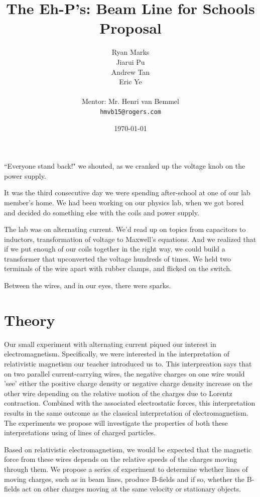 \documentclass[12pt,letterpaper]{article}
\begin{document}
\title{The Eh-P's: Beam Line for Schools Proposal}
\author{
Ryan Marks\\
Jiarui Pu \\ 
Andrew Tan\\
Eric Ye\\
\\
Mentor: Mr. Henri van Bemmel\\
\normalsize{\texttt{hmvb15@rogers.com}}
}

\date{\today}
\maketitle

``Everyone stand back!" we shouted, as we cranked up the voltage knob on the power supply.

It was the third consecutive day we were spending after-school at one of our lab member’s home. We had been working on our physics lab, when we got bored and decided do something else with the coils and power supply.

The lab was on alternating current. We’d read up on topics from capacitors to inductors, transformation of voltage to Maxwell's equations.
And we realized that if we put enough of our coils together in the right way, we could build a transformer that upconverted the voltage hundreds of times. We held two terminals of the wire apart with rubber clamps, and flicked on the switch.

Between the wires, and in our eyes, there were sparks.
\section{Theory}
Our small experiment with alternating current piqued our interest in electromagnetism. Specifically, we were interested in the interpretation of relativistic magnetism our teacher introduced us to. 
This interpreation says that on two parallel current-carrying wires, the negative charges on one wire would 'see' either the positive charge density or negative charge density increase on the other wire depending on the relative motion of the charges due to Lorentz contraction.
Combined with the associated electrostatic forces, this interpretation results in the same outcome as the classical interpretation of electromagnetism.
The experiments we propose will investigate the properties of both these interpretations using of lines of charged particles.

Based on relativistic electromagnetism, we would be expected that the magnetic force from these wires depends on the relative speeds of the charges moving through them.
We propose a series of experiment to determine whether lines of moving charges, such as in beam lines, produce B-fields and if so, whether the B-fields act on other charges moving at the same velocity or stationary objects.
\end{document}
